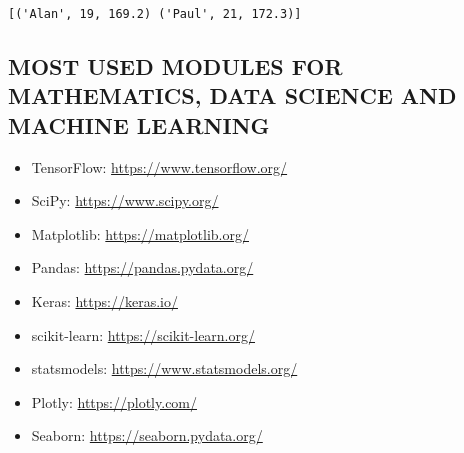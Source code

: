 \documentclass[11pt]{article}
\providecommand{\tightlist}{%
      \setlength{\itemsep}{0pt}\setlength{\parskip}{0pt}}
\begin{document}
    \begin{Verbatim}[commandchars=\\\{\}]
[('Alan', 19, 169.2) ('Paul', 21, 172.3)]
    \end{Verbatim}

    \hypertarget{most-used-modules-for-mathematics-data-science-and-machine-learning}{%
\subsection{MOST USED MODULES FOR MATHEMATICS, DATA SCIENCE AND MACHINE
LEARNING}\label{most-used-modules-for-mathematics-data-science-and-machine-learning}}

    \begin{itemize}
\tightlist
\item
  TensorFlow: \url{https://www.tensorflow.org/}
\item
  SciPy: \url{https://www.scipy.org/}
\item
  Matplotlib: \url{https://matplotlib.org/}
\item
  Pandas: \url{https://pandas.pydata.org/}
\item
  Keras: \url{https://keras.io/}
\item
  scikit-learn: \url{https://scikit-learn.org/}
\item
  statsmodels: \url{https://www.statsmodels.org/}
\item
  Plotly: \url{https://plotly.com/}
\item
  Seaborn: \url{https://seaborn.pydata.org/}
\end{itemize}


    
    
    
\end{document}
